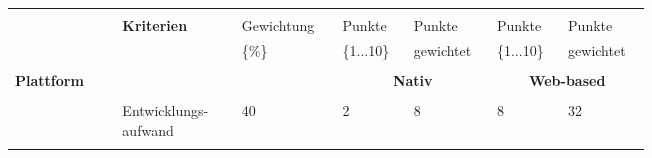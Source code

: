 \documentclass[main.tex]{subfiles} %
\begin{document}
\begin{table}[ht]
    \centering
    \begin{tabular}{|p{0.14\linewidth}|p{0.15\linewidth}|p{0.115\linewidth}|p{0.08\linewidth}|p{0.09\linewidth}|p{0.08\linewidth}|p{0.09\linewidth}|}
        \hline
                                                           &                                     &                                              &                                                &             &            &             \\[-9pt]
                                                           & \multirow{2}{*}{\textbf{Kriterien}} & Gewichtung                                   & Punkte                                         & Punkte      & Punkte     & Punkte      \\[1pt]
                                                           &                                     & \{\%\}                                       & \{1...10\}                                     & gewichtet   & \{1...10\} & gewichtet   \\[1pt]
        \hline
        \hline
                                                           & \multicolumn{2}{c|}{}               & \multicolumn{2}{c|}{}                        & \multicolumn{2}{c|}{}                                                                   \\[-9pt]
        \multirow{5}{4em}{\textbf{Plattform}}              & \multicolumn{2}{c|}{}               & \multicolumn{2}{c|}{\textbf{Nativ}}          & \multicolumn{2}{c|}{\textbf{Web-based}}                                                 \\[1pt]
        \cline{2-7}
                                                           &                                     &                                              &                                                &             &            &             \\[-9pt]
                                                           & Entwicklungs-aufwand                & 40                                           & 2                                              & 8           & 8          & 32          \\[1pt]
        \cline{2-7}
                                                           &                                     &                                              &                                                &             &            &             \\[-9pt]

\end{tabular}
\end{table}
\end{document}
